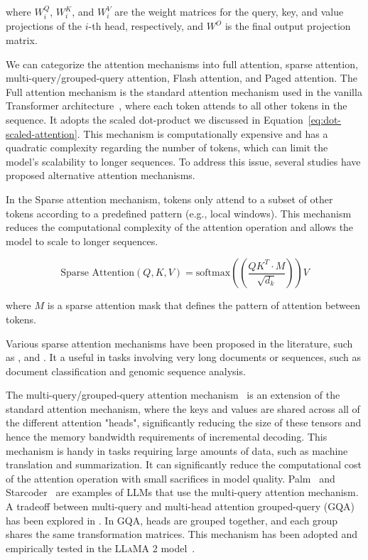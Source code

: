 \noindent where \(W_i^Q\), \(W_i^K\), and \(W_i^V\) are the weight matrices for the query, key, and value projections of the \(i\)-th head, respectively, and \(W^O\) is the final output projection matrix.

We can categorize the attention mechanisms into full attention, sparse attention, multi-query/grouped-query attention, Flash attention, and Paged attention.
The Full attention mechanism is the standard attention mechanism used in the vanilla Transformer architecture~\cite{vaswani2023attention}, where each token attends to all other tokens in the sequence.
It adopts the scaled dot-product we discussed in Equation~\ref{eq:dot-scaled-attention}.
This mechanism is computationally expensive and has a quadratic complexity regarding the number of tokens, which can limit the model's scalability to longer sequences.
To address this issue, several studies have proposed alternative attention mechanisms.

In the Sparse attention mechanism, tokens only attend to a subset of other tokens according to a predefined pattern (e.g., local windows).
This mechanism reduces the computational complexity of the attention operation and allows the model to scale to longer sequences.

\begin{equation}
	\text{Sparse Attention}(Q, K, V) = \text{softmax}((\frac{QK^T \cdotp M}{\sqrt{d_k}}))V
	\label{eq:sparse-attention}
\end{equation}

\noindent where \(M\) is a sparse attention mask that defines the pattern of attention between tokens.

Various sparse attention mechanisms have been proposed in the literature, such as \textcite{peng2021random}, \textcite{zaheer2020big} and \textcite{child2019generating}.
It a useful in tasks involving very long documents or sequences, such as document classification and genomic sequence analysis.

The multi-query/grouped-query attention mechanism~\cite{shazeer2019fast} is an extension of the standard attention mechanism, where the keys and values are shared across all of the different attention "heads", significantly reducing the size of these tensors and hence the memory bandwidth requirements of incremental decoding.
This mechanism is handy in tasks requiring large amounts of data, such as machine translation and summarization.
It can significantly reduce the computational cost of the attention operation with small sacrifices in model quality.
Palm~\cite{chowdhery2022palm} and Starcoder~\cite{li2023starcoder} are examples of LLMs that use the multi-query attention mechanism.
A tradeoff between multi-query and multi-head attention grouped-query (GQA) has been explored in \textcite{ainslie2023gqa}.
In GQA, heads are grouped together, and each group shares the same transformation matrices.
This mechanism has been adopted and empirically tested in the \textsc{LLaMA} 2 model~\cite{touvron2023llama2}.

